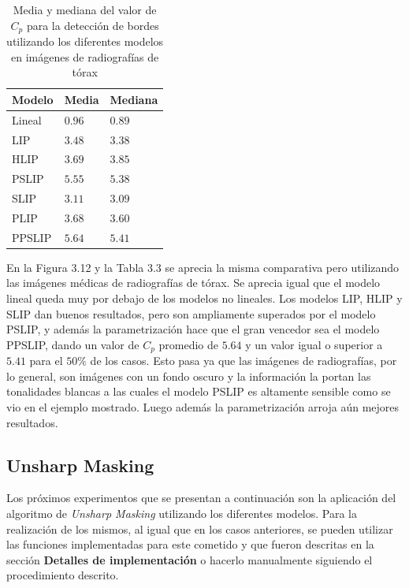 \begin{table}
	\begin{center}
		\begin{tabular}{|l|l|l|}
			\hline 
			Modelo & Media & Mediana\\
			\hline
			Lineal & $0.96$ & $0.89$\\
			\hline
			LIP & $3.48$ & $3.38$\\
			\hline
			HLIP & $3.69$ & $3.85$\\
			\hline
			PSLIP & $5.55$ & $5.38$\\
			\hline
			SLIP & $3.11$ & $3.09$\\
			\hline
			PLIP & $3.68$ & $3.60$\\
			\hline
			PPSLIP & $5.64$ & $5.41$\\
			\hline
		\end{tabular}
		\caption{Media y mediana del valor de $C_p$ para la detecci\'on de bordes utilizando los diferentes modelos en im\'agenes de radiograf\'ias de t\'orax}
	\end{center}
\end{table}

En la Figura 3.12 y la Tabla 3.3 se aprecia la misma comparativa pero utilizando las im\'agenes m\'edicas de radiograf\'ias de t\'orax. Se aprecia igual que el modelo lineal queda muy por debajo de los modelos no lineales. Los modelos LIP, HLIP y SLIP dan buenos resultados, pero son ampliamente superados por el modelo PSLIP, y adem\'as la parametrizaci\'on hace que el gran vencedor sea el modelo PPSLIP, dando un valor de $C_p$ promedio de $5.64$ y un valor igual o superior a $5.41$ para el $50\%$  de los casos. Esto pasa ya que las im\'agenes de radiograf\'ias, por lo general, son im\'agenes con un fondo oscuro y la informaci\'on la portan las tonalidades blancas a las cuales el modelo PSLIP es altamente sensible como se vio en el ejemplo mostrado. Luego adem\'as la parametrizaci\'on arroja a\'un mejores resultados. 

\subsection{Unsharp Masking}

Los pr\'oximos experimentos que se presentan a continuaci\'on son la aplicaci\'on del algoritmo de \textit{Unsharp Masking} utilizando los diferentes modelos. Para la realizaci\'on de los mismos, al igual que en los casos anteriores, se pueden utilizar las funciones implementadas para este cometido y que fueron descritas en la secci\'on \textbf{Detalles de implementaci\'on} o hacerlo manualmente siguiendo el procedimiento descrito.

